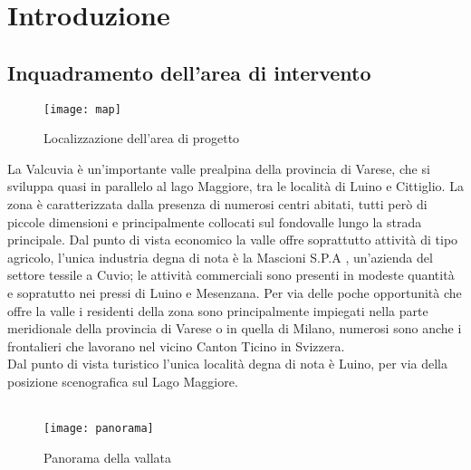 \documentclass{article}
\begin{document}
\section{Introduzione}
\subsection{Inquadramento dell'area di intervento}
\begin{figure}[H]
\centering
\texttt{[image: map]}
\caption{Localizzazione dell'area di progetto} 
\end{figure}
La Valcuvia è un'importante valle prealpina della provincia di Varese, che si sviluppa quasi in parallelo al lago Maggiore, tra le località di Luino e Cittiglio. La zona è caratterizzata dalla presenza di numerosi centri abitati, tutti però di piccole dimensioni e principalmente collocati sul fondovalle lungo la strada principale. Dal punto di vista economico la valle offre soprattutto attività di tipo agricolo, l'unica industria degna di nota è la Mascioni S.P.A , un'azienda del settore tessile a Cuvio; le attività commerciali sono presenti in modeste quantità e sopratutto nei pressi di Luino e Mesenzana. Per via delle poche opportunità che offre la valle i residenti della zona sono principalmente impiegati nella parte meridionale della provincia di Varese o in quella di Milano, numerosi sono anche i frontalieri che lavorano nel vicino Canton Ticino in Svizzera.\\
Dal punto di vista turistico l'unica località degna di nota è Luino, per via della posizione scenografica sul Lago Maggiore.\\
\\
\begin{figure}[H]
\centering
\texttt{[image: panorama]}
\caption{Panorama della vallata} 
\end{figure}
\end{document}
